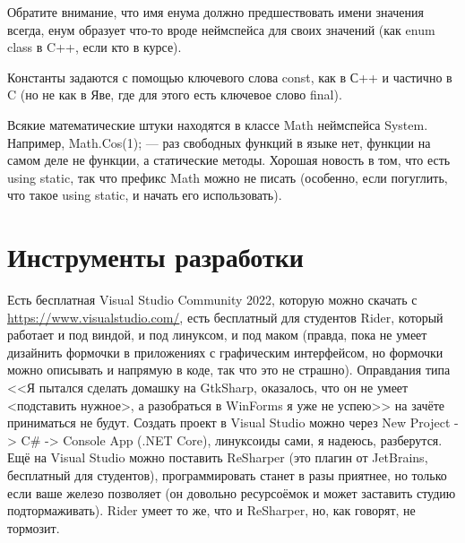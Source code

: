 \documentclass[a5paper]{article}
\begin{document}
Обратите внимание, что имя енума должно предшествовать имени значения всегда, енум образует что-то вроде неймспейса для своих значений (как enum class в C++, если кто в курсе).

Константы задаются с помощью ключевого слова const, как в С++ и частично в C (но не как в Яве, где для этого есть ключевое слово final).

Всякие математические штуки находятся в классе Math неймспейса System. Например, Math.Cos(1); --- раз свободных функций в языке нет, функции на самом деле не функции, а статические методы. Хорошая новость в том, что есть using static, так что префикс Math можно не писать (особенно, если погуглить, что такое using static, и начать его использовать).

\section{Инструменты разработки}

Есть бесплатная Visual Studio Community 2022, которую можно скачать с \url{https://www.visualstudio.com/}, есть бесплатный для студентов Rider, который работает и под виндой, и под линуксом, и под маком (правда, пока не умеет дизайнить формочки в приложениях с графическим интерфейсом, но формочки можно описывать и напрямую в коде, так что это не страшно). Оправдания типа <<Я пытался сделать домашку на GtkSharp, оказалось, что он не умеет <подставить нужное>, а разобраться в WinForms я уже не успею>> на зачёте приниматься не будут. Создать проект в Visual Studio можно через New Project -> C\# -> Console App (.NET Core), линуксоиды сами, я надеюсь, разберутся. Ещё на Visual Studio можно поставить ReSharper (это плагин от JetBrains, бесплатный для студентов), программировать станет в разы приятнее, но только если ваше железо позволяет (он довольно ресурсоёмок и может заставить студию подтормаживать). Rider умеет то же, что и ReSharper, но, как говорят, не тормозит.
\end{document}
